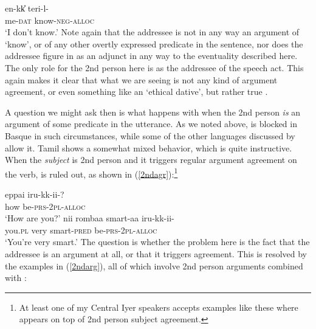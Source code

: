 \documentclass[output=paper, modfonts, nonflat]{langsci/langscibook}
\begin{document}
\ea\label{dunno}\gll en\A-kk\U{} teri-l\A-\nga\\
me-\textsc{dat}{} know-\textsc{neg}-\textsc{alloc}\\
\glt `I don't know.'
\z
%
Note again that the addressee is not in any way an argument of `know',
or of any other overtly expressed predicate in the sentence, nor does
the addressee figure in as an adjunct in any way to the eventuality
described here. The only role for the 2nd person here is as the
addressee of the speech act. This again makes it clear that what we
are seeing is not any kind of argument agreement, or even something
like an `ethical dative', but rather true \allagr.


A question we might ask then is what happens with \allagr{} when the
2nd person \emph{is} an argument of some predicate in the
utterance. As we noted above, \allagr{} is blocked in Basque in such
circumstances, while some of the other languages discussed by
\citet{antonov:2015} allow it. Tamil shows a somewhat mixed behavior,
which is quite instructive. When the \emph{subject} is 2nd person and
it triggers regular argument agreement on the verb, \allagr{} is ruled
out, as shown in (\ref{2ndagr}):\footnote{At least one of my Central
  Iyer speakers accepts examples like these where \allagr{} appears on
  top of 2nd person subject agreement.}

\ea\label{2ndagr}
  \ea
    \label{howare}\gll *eppa\D i iru-kk-ii\nga-\nga?\\
    how be-\textsc{prs}-2\textsc{pl}-\textsc{alloc}\\
    \glt `How are you?'
  \ex
    \label{smart}\gll *nii\nga{} rombaa smart-aa iru-kk-ii\nga-\nga\\
    you.\textsc{pl} very smart-\textsc{pred}{} be-\textsc{prs}-2\textsc{pl}-\textsc{alloc}\\
    \glt `You're very smart.'
  \z
\z
%
The question is whether the problem here is the fact that the
addressee is an argument at all, or that it triggers
agreement. %
This is resolved by the examples in (\ref{2ndarg}), all of which
involve 2nd person arguments combined with \allagr:
\end{document}
